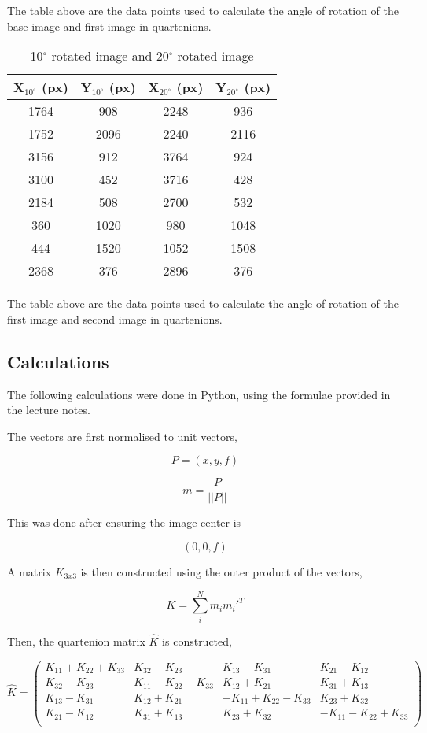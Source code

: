 \documentclass{article}
\begin{document}
The table above are the data points used to calculate the angle of rotation of the base image and first image in quartenions.

\newpage
\begin{table}[h]
\centering
  \begin{tabular}{|c|c|c|c|}
  \hline

  X$_{10^{\circ}}$ (px) & Y$_{10^{\circ}}$ (px) & X$_{20^{\circ}}$ (px) & Y$_{20^{\circ}}$ (px)\\ \hline
  1764 & 908 & 2248 & 936 \\ \hline
  1752 & 2096 & 2240 & 2116 \\ \hline
  3156  & 912 & 3764 & 924 \\ \hline
  3100 & 452 & 3716 & 428 \\ \hline
  2184 & 508 & 2700 & 532 \\ \hline
  360 & 1020 & 980 & 1048 \\ \hline
  444 & 1520 & 1052 & 1508 \\ \hline
  2368 & 376 & 2896 & 376 \\ \hline
  \end{tabular}
\caption{10$^{\circ}$ rotated image and 20$^{\circ}$ rotated image}
\label{tab:error}
\end{table}

The table above are the data points used to calculate the angle of rotation of the first image and second image in quartenions.

\subsection{Calculations}

The following calculations were done in Python, using the formulae provided in the lecture notes.

The vectors are first normalised to unit vectors,

$$P = (x, y, f)$$

$$m = \frac{P}{||P||}$$

This was done after ensuring the image center is

$$(0, 0, f)$$

A matrix $K_{3x3}$ is then constructed using the outer product of the vectors,

$$K = \sum_{i}^N m_{i}m_{i}'^{T}$$

Then, the quartenion matrix $\hat{K}$ is constructed,

$$
\hat{K} = 
\begin{pmatrix}
  K_{11} + K_{22} + K_{33} & K_{32} - K_{23} & K_{13} - K_{31} & K_{21} - K_{12} \\
  K_{32} - K_{23} & K_{11} - K_{22} - K_{33} & K_{12} + K_{21} & K_{31} + K_{13} \\
  K_{13} - K_{31} & K_{12} + K_{21} & -K_{11} + K_{22} - K_{33} & K_{23} + K_{32} \\
  K_{21} - K_{12} & K_{31} + K_{13} & K_{23} + K_{32} & -K_{11} - K_{22} + K_{33} \\
\end{pmatrix}
$$
\end{document}
